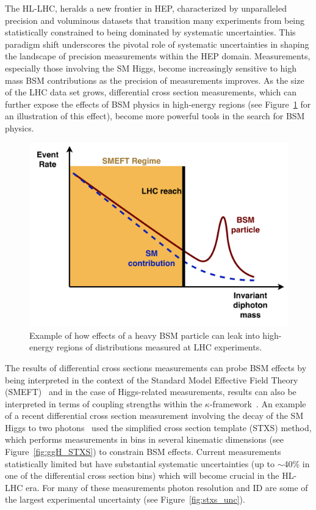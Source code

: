 \documentclass[letter, USenglish, 11pt, subfigure]{article}
\begin{document}
The HL-LHC, heralds a new frontier in HEP, characterized by unparalleled precision and voluminous datasets that transition many experiments from being statistically constrained to being dominated by systematic uncertainties. This paradigm shift underscores the pivotal role of systematic uncertainties in shaping the landscape of precision measurements within the HEP domain. 
Measurements, especially those involving the SM Higgs, become increasingly sensitive to high mass BSM contributions as the precision of measurements improves. As the size of the LHC data set grows, differential cross section measurements, which can further expose the effects of BSM physics in high-energy regions (see Figure~\ref{fig:SMEFT_highmass} for an illustration of this effect), become more powerful tools in the search for BSM physics.
\begin{figure}
  \centering
  \includegraphics[width=\linewidth]{figures/SMEFT.pdf}
  \caption{\label{fig:SMEFT_highmass} Example of how effects of a heavy BSM particle can leak into high-energy regions of distributions measured at LHC experiments.}
\end{figure}
The results of differential cross sections measurements can probe BSM effects by being interpreted in the context of the Standard Model Effective Field Theory (SMEFT)~\cite{Buchmuller:1985jz,Grzadkowski:2010es,SMEFTsim3} and in the case of Higgs-related measurements, results can also be interpreted in terms of coupling strengths within the $\kappa$-framework~\cite{deFlorian:2016spz}. An example of a recent differential cross section measurement involving the decay of the SM Higgs to two photons~\cite{ATLAS_STXS} used the simplified cross section template (STXS) method, which performs measurements in bins in several kinematic dimensions (see Figure~\ref{fig:ggH_STXS}) to constrain BSM effects. Current measurements statistically limited but have substantial systematic uncertainties (up to $\sim$40\% in one of the differential cross section bins) which will become crucial in the HL-LHC era. For many of these measurements photon resolution and ID are some of the largest experimental uncertainty (see Figure~\ref{fig:stxs_unc}). 
\end{document}
